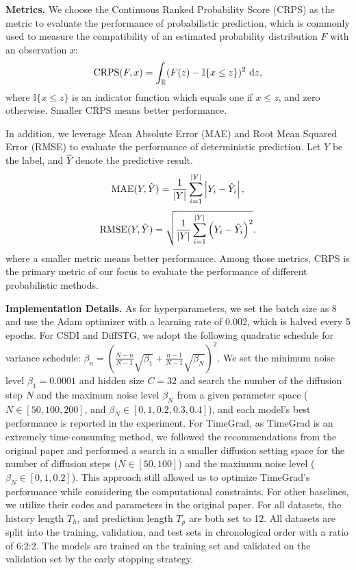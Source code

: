 {\begin{itemize}[leftmargin=*]
\end{itemize}

\par \noindent \textbf{Metrics.} We choose the Continuous Ranked Probability Score (CRPS) \cite{matheson1976scoring} as the metric to evaluate the performance of probabilistic prediction, which is commonly used to measure the compatibility of an estimated probability distribution $F$ with an observation $x$:
\begin{equation}
    {\rm CRPS}(F, x)=\int_{\mathbb{R}}(F(z)-\mathbb{I}\{x \leq z\})^2 \mathrm{~d} z,
\end{equation}
where $\mathbb{I}\{x \leq z\}$ is an indicator function which equals one if $x \leq z$, and zero otherwise. Smaller CRPS means better performance.

In addition, we leverage Mean Absolute Error (MAE) and Root Mean Squared Error (RMSE) to evaluate the performance of deterministic prediction. Let $Y$ be the label, and $\hat{Y}$ denote the predictive result. 
\begin{equation}
    {\rm MAE}(Y, \hat{Y})=\frac{1}{\left| Y \right|}\sum^{\left| Y \right|}_{i=1}\left| Y_{i} - \hat{Y}_{i}\right|,
\end{equation}
\begin{equation}
   {\rm RMSE}(Y, \hat{Y})=\sqrt{\frac{1}{\left| Y \right|}\sum^{\left| Y \right|}_{i=1}\left( Y_{i} - \hat{Y}_{i}\right)^{2}}.
\end{equation}
where a smaller metric means better performance. Among those metrics, CRPS is the primary metric of our focus to evaluate the performance of different probabilistic methods. 

\par \noindent \textbf{Implementation Details.} As for hyperparameters, we set the batch size as 8 and use the Adam optimizer with a learning rate of 0.002, which is halved every 5 epochs. For CSDI and DiffSTG, we adopt the following quadratic schedule for variance schedule: $ \beta_n=\left(\frac{N-n}{N-1} \sqrt{\beta_1}+\frac{n-1}{N-1} \sqrt{\beta_N}\right)^2$. We set the minimum noise level $\beta_1 =  0.0001$ and hidden size $C= 32$ and search the number of the diffusion step $N$ and the maximum noise level $\beta_N$ from a given parameter space ($N \in [50, 100, 200]$, and $\beta_N \in [0,1, 0.2, 0.3, 0.4]$), and each model's best performance is reported in the experiment. For TimeGrad, as TimeGrad is an extremely time-consuming method, we followed the recommendations from the original paper and performed a search in a smaller diffusion setting space for the number of diffusion steps ($N \in [50, 100]$) and the maximum noise level ($\beta_N \in [0,1, 0.2]$). This approach still allowed us to optimize TimeGrad's performance while considering the computational constraints. For other baselines, we utilize their codes and parameters in the original paper. For all datasets, the history length $T_h$, and prediction length $T_p$ are both set to 12. All datasets are split into the training, validation, and test sets in chronological order with a ratio of 6:2:2. The models are trained on the training set and validated on the validation set by the early stopping strategy. %

}
